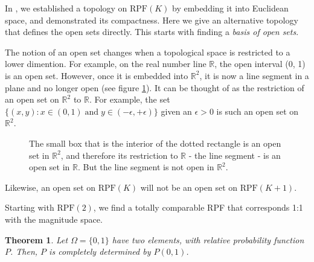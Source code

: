 \documentclass[twoside]{article}
\theoremstyle{plain}%
\newtheorem{theorem}{Theorem}[section]
\theoremstyle{definition}
\theoremstyle{remark}
\begin{document}
In \cite{paper}, we established a topology on \(\text{RPF}(K)\) by embedding it into Euclidean space, and demonstrated its compactness. Here we give an alternative topology that defines the open sets directly. This starts with finding a \textit{basis of open sets}.

The notion of an open set changes when a topological space is restricted to a lower dimention. For example, on the real number line \(\mathbb{R}\), the open interval (0, 1) is an open set. However, once it is embedded into \(\mathbb{R}^2\), it is now a line segment in a plane and no longer open (see figure \ref{fig:sub_topology}). It can be thought of as the restriction of an open set on \(\mathbb{R}^2\) to \(\mathbb{R}\). For example, the set \(\{(x, y): x \in (0, 1)\;  \text{and}\;  y \in (-\epsilon, +\epsilon)\}\) given an \(\epsilon > 0\) is such an open set on \(\mathbb{R}^2\).

\begin{figure}[h]
\centering
{}
\caption{The small box that is the interior of the dotted rectangle is an open set in \(\mathbb{R}^2\), and therefore its restriction to \(\mathbb{R}\) - the line segment - is an open set in \(\mathbb{R}\). But the line segment is not open in \(\mathbb{R}^2\).}
\label{fig:sub_topology}
\end{figure}

Likewise, an open set on \(\text{RPF}(K)\) will not be an open set on \(\text{RPF}(K+1)\).

Starting with \(\text{RPF}(2)\), we find a totally comparable RPF that corresponds 1:1 with the magnitude space.

\begin{theorem}
Let \(\Omega = \{0, 1\}\) have two elements, with relative probability function \(P\). Then, \(P\) is completely determined by \(P(0, 1)\).
\end{theorem}
\end{document}
